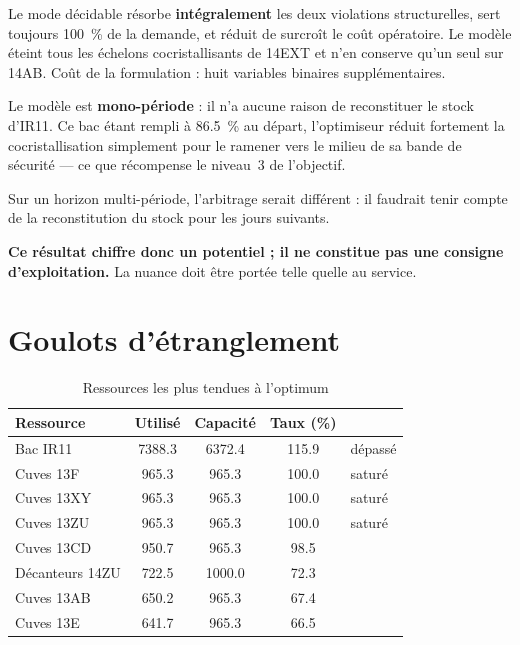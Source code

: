 \begin{resultat}
Le mode décidable résorbe \textbf{intégralement} les deux violations structurelles, sert
toujours \SI{100}{\percent} de la demande, et réduit de surcroît le coût opératoire. Le
modèle éteint tous les échelons cocristallisants de 14EXT et n'en conserve qu'un seul sur
14AB. Coût de la formulation : huit variables binaires supplémentaires.
\end{resultat}

\begin{alerte}[title={Une réserve qui doit accompagner ce chiffre}]
Le modèle est \textbf{mono-période} : il n'a aucune raison de reconstituer le stock d'IR11.
Ce bac étant rempli à \SI{86,5}{\percent} au départ, l'optimiseur réduit fortement la
cocristallisation simplement pour le ramener vers le milieu de sa bande de sécurité --- ce
que récompense le niveau~3 de l'objectif.

Sur un horizon multi-période, l'arbitrage serait différent : il faudrait tenir compte de la
reconstitution du stock pour les jours suivants.

\textbf{Ce résultat chiffre donc un potentiel ; il ne constitue pas une consigne
d'exploitation.} La nuance doit être portée telle quelle au service.
\end{alerte}

\section{Goulots d'étranglement}

\begin{table}[H]
\centering
\caption{Ressources les plus tendues à l'optimum}
\label{tab:goulots}
\begin{tabular}{@{}lS[table-format=4.1]S[table-format=4.1]S[table-format=3.1]l@{}}
\toprule
\textbf{Ressource} & {\textbf{Utilisé}} & {\textbf{Capacité}} & {\textbf{Taux} (\si{\percent})} & \\
\midrule
Bac IR11 & 7388.3 & 6372.4 & 115.9 & dépassé \\
Cuves 13F & 965.3 & 965.3 & 100.0 & saturé \\
Cuves 13XY & 965.3 & 965.3 & 100.0 & saturé \\
Cuves 13ZU & 965.3 & 965.3 & 100.0 & saturé \\
Cuves 13CD & 950.7 & 965.3 & 98.5 & \\
Décanteurs 14ZU & 722.5 & 1000.0 & 72.3 & \\
Cuves 13AB & 650.2 & 965.3 & 67.4 & \\
Cuves 13E & 641.7 & 965.3 & 66.5 & \\
\bottomrule
\end{tabular}
\end{table}

